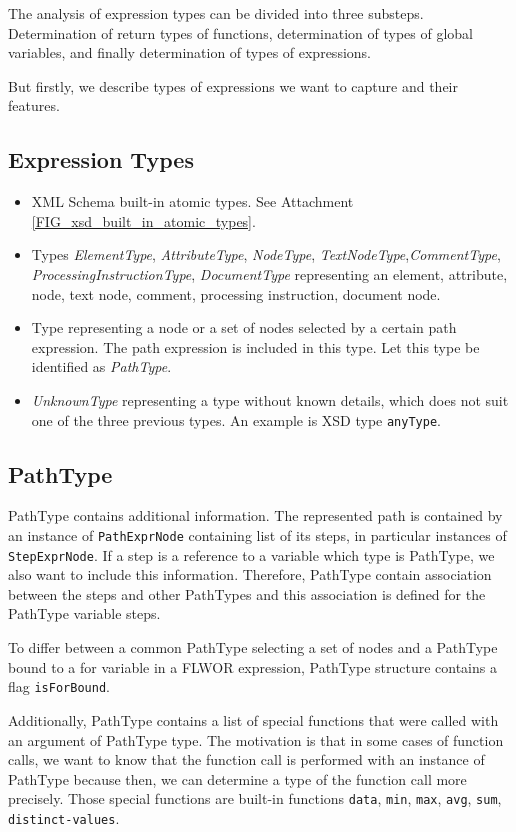 The analysis of expression types can be divided into three substeps. Determination of return types of functions, determination of types of global variables, and finally determination of types of expressions.

But firstly, we describe types of expressions we want to capture and their features.

\subsection{Expression Types}
\begin{itemize}
\item XML Schema built-in atomic types. See Attachment \ref{FIG_xsd_built_in_atomic_types}.
\item Types \emph{ElementType}, \emph{AttributeType}, \emph{NodeType}, \emph{TextNodeType},\linebreak \emph{CommentType}, \emph{ProcessingInstructionType}, \emph{DocumentType} representing an element, attribute, node, text node, comment, processing instruction, document node.
\item Type representing a node or a set of nodes selected by a certain path expression. The path expression is included in this type. Let this type be identified as \emph{PathType}.
\item \emph{UnknownType} representing a type without known details, which does not suit one of the three previous types. An example is XSD type \texttt{anyType}.
\end{itemize}

\subsection{PathType}
PathType contains additional information. The represented path is contained by an instance of \texttt{PathExprNode} containing list of its steps, in particular instances of \texttt{StepExprNode}. If a step is a reference to a variable which type is PathType, we also want to include this information. Therefore, PathType contain association between the steps and other PathTypes and this association is defined for the PathType variable steps.

To differ between a common PathType selecting a set of nodes and a PathType bound to a for variable in a FLWOR expression, PathType structure contains a flag \texttt{isForBound}.

Additionally, PathType contains a list of special functions that were called with an argument of PathType type. The motivation is that in some cases of function calls, we want to know that the function call is performed with an instance of PathType because then, we can determine a type of the function call more precisely. Those special functions are built-in functions \texttt{data}, \texttt{min}, \texttt{max}, \texttt{avg}, \texttt{sum}, \texttt{distinct-values}. 

